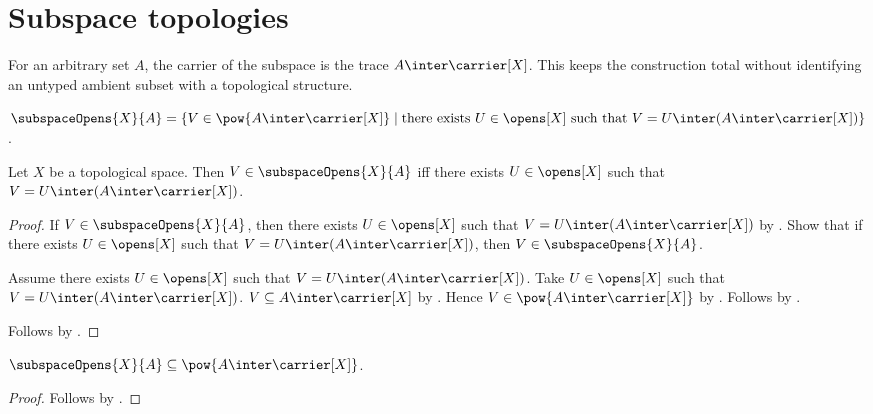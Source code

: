 \section{Subspace topologies}



For an arbitrary set $A$, the carrier of the subspace is the trace
$A\inter\carrier[X]$.  This keeps the construction total without identifying
an untyped ambient subset with a topological structure.

\begin{definition}\label{subspace_opens}
    $\subspaceOpens{X}{A}=
        \{V\in\pow{A\inter\carrier[X]}\mid
            \text{there exists $U\in\opens[X]$ such that
                $V=U\inter(A\inter\carrier[X])$}\}$.
\end{definition}

\begin{proposition}\label{subspace_opens_iff}
    Let $X$ be a topological space.
    Then $V\in\subspaceOpens{X}{A}$ iff
        there exists $U\in\opens[X]$ such that
            $V=U\inter(A\inter\carrier[X])$.
\end{proposition}
\begin{proof}
    If $V\in\subspaceOpens{X}{A}$, then there exists
        $U\in\opens[X]$ such that
            $V=U\inter(A\inter\carrier[X])$
        by .
    Show that if there exists $U\in\opens[X]$ such that
        $V=U\inter(A\inter\carrier[X])$, then
        $V\in\subspaceOpens{X}{A}$.
    \begin{subproof}
        Assume there exists $U\in\opens[X]$ such that
            $V=U\inter(A\inter\carrier[X])$.
        Take $U\in\opens[X]$ such that
            $V=U\inter(A\inter\carrier[X])$.
        $V\subseteq A\inter\carrier[X]$
            by .
        Hence $V\in\pow{A\inter\carrier[X]}$
            by .
        Follows by .
    \end{subproof}
    Follows by \auto.
\end{proof}

\begin{proposition}\label{subspace_opens_type}
    $\subspaceOpens{X}{A}\subseteq\pow{A\inter\carrier[X]}$.
\end{proposition}
\begin{proof}
    Follows by .
\end{proof}

